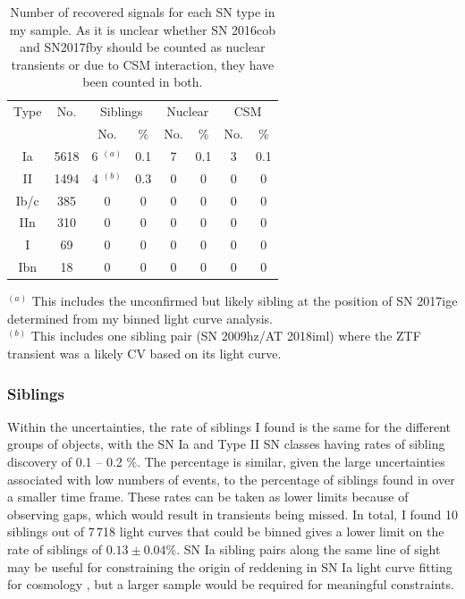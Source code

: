 \documentclass[a4paper,oneside,12pt, class=Latex/Classes/PhDthesisPSnPDF, crop=false]{standalone}
\begin{document}
\begin{table}[]
   \caption{Number of recovered signals for each SN type in my sample. As it is unclear whether SN 2016cob and SN2017fby should be counted as nuclear transients or due to CSM interaction, they have been counted in both.}
    \centering
    \begin{tabular}{cccccccc}
        \hline
        \hline
        Type & No.  & \multicolumn{2}{c}{Siblings}  & \multicolumn{2}{c}{Nuclear} &  \multicolumn{2}{c}{CSM}  \\
        && No. & \% & No. & \%& No. & \% \\
        \hline
        Ia & 5618 & 6 $^{(a)}$ & 0.1 & 7 & 0.1 & 3 & 0.1\\
        II & 1494 & 4 $^{(b)}$ & 0.3 &  0 & 0 & 0 & 0 \\
        Ib/c & 385 & 0 & 0 & 0 & 0 & 0 & 0 \\
        IIn & 310 & 0 & 0 & 0 & 0 & 0 & 0 \\
        I & 69 & 0 & 0 & 0 & 0 & 0 & 0 \\
       Ibn & 18 & 0 & 0 & 0 & 0 & 0 & 0 \\
        \hline
    \end{tabular}
     \label{recovered_obj_breakdown}
    \begin{flushleft}
        $^{(a)}$ This includes the unconfirmed but likely sibling at the position of SN 2017ige determined from my binned light curve analysis.\\
        $^{(b)}$ This includes one sibling pair (SN 2009hz/AT 2018iml) where the ZTF transient was a likely CV based on its light curve.\\
    \end{flushleft}
\end{table}


\subsubsection{Siblings}
Within the uncertainties, the rate of siblings I found is the same for the different groups of objects, with the SN Ia and Type II SN classes having rates of sibling discovery of 0.1 -- 0.2 \%. The percentage is similar, given the large uncertainties associated with low numbers of events, to the percentage of siblings found in \citet{Terwel_2024_paper1} over a smaller time frame. These rates can be taken as lower limits because of observing gaps, which would result in transients being missed. In total, I found 10 siblings out of 7\,718 light curves that could be binned gives a lower limit on the rate of siblings of $0.13\pm0.04\%$. SN Ia sibling pairs along the same line of sight may be useful for constraining the origin of reddening in SN Ia light curve fitting for cosmology \citep{DR2_siblings}, but a larger sample would be required for meaningful constraints.
\end{document}
